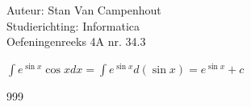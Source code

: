 \documentclass[a4paper]{article}
\begin{document}
  
\noindent \large Auteur: Stan Van Campenhout \\
\noindent \large Studierichting:  Informatica\\
\noindent \large Oefeningenreeks 4A nr. 34.3\\

\medskip

\normalsize

$ \displaystyle\int e^{\sin x}\cos xdx = \displaystyle\int e^{\sin x}d\left(\sin x\right) = e^{\sin x} + c $\\

\begin{thebibliography}{999}
\end{thebibliography}
\end{document}
